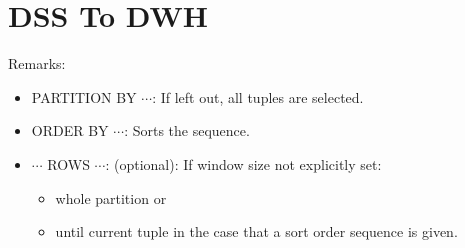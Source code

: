 
\section{DSS To DWH}

\begin{breakbox}
Remarks:
\begin{itemize}
	\item PARTITION BY $\cdots$: If left out, all tuples are selected.
	\item ORDER BY $\cdots$: Sorts the sequence.
	\item $\cdots$ ROWS $\cdots$: (optional): If window size not explicitly set:
		\begin{itemize}
			\item whole partition or
			\item until current tuple in the case that a sort order sequence is given.
		\end{itemize}
\end{itemize}
\end{breakbox}

\begin{breakbox}
\end{breakbox}

\begin{breakbox}
\end{breakbox}

\begin{breakbox}
\end{breakbox}

\begin{breakbox}
\end{breakbox}


